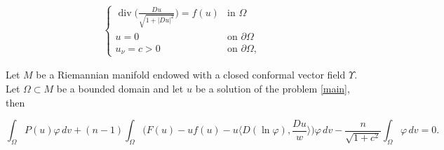 \documentclass[10pt,a4paper]{amsart}
\begin{document}
\begin{align} \label{main}
\left\{
\begin{array}{lll}
 \operatorname{div}\Big(\frac{D u}{\sqrt{1+|D u|^2}}\Big)=f(u) & \text{in } \Omega \\
u= 0& \text{on } \partial\Omega \\
u_{\nu}=c>0& \text{on } \partial\Omega, 
\end{array}
\right.  
\end{align}

\begin{lemma}\label{Lemma pohozaev}
    Let $M$ be a Riemannian manifold endowed with a closed conformal vector field $\Upsilon$. Let $\Omega\subset M$ be a bounded domain and let $u$ be a solution of the problem \eqref{main}, then  

\[
\int_\Omega P(u)\varphi\, dv + (n-1)\int_\Omega\Big(F(u) - uf(u) - u\Big\langle D(\ln\varphi), \frac{Du}{w}\Big\rangle\Big)\varphi\, dv -\frac{n}{\sqrt{1+c^2}}\int_\Omega\varphi\, dv=0.
\]
\end{lemma}
\end{document}
